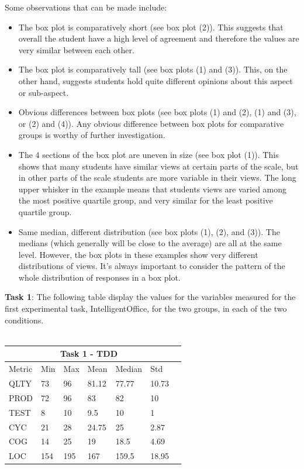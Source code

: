 Some observations that can be made include:
\begin{itemize}
    \item The box plot is comparatively short (see box plot  (2)). This suggests that overall the student have a high level of agreement and therefore the values are very similar between each other.
    \item The box plot is comparatively tall (see box plots (1) and (3)). This, on the other hand, suggests students hold quite different opinions about this aspect or sub-aspect.
    \item Obvious differences between box plots (see box plots (1) and (2), (1) and (3), or (2) and (4)). Any obvious difference between box plots for comparative groups is worthy of further investigation.
    \item The 4 sections of the box plot are uneven in size (see box plot (1)). This shows that many students have similar views at certain parts of the scale, but in other parts of the scale students are more variable in their views. The long upper whisker in the example means that students views are varied among the most positive quartile group, and very similar for the least positive quartile group. 
    \item Same median, different distribution (see box plots (1), (2), and (3)). The medians (which generally will be close to the average) are all at the same level. However, the box plots in these examples show very different distributions of views. It's always important to consider the pattern of the whole distribution of responses in a box plot.
\end{itemize}

\noindent\textbf{Task 1}: The following table display the values for the variables measured for the first experimental task, IntelligentOffice, for the two groups, in each of the two conditions.
\\ \  \\
\noindent
\begin{tabular}{ |p{2cm}||p{1.6cm}|p{1.6cm}|p{1.6cm}|p{1.6cm}|p{1.6cm}|p{1.6cm}| }
    \hline
        \multicolumn{6}{|c|}{Task 1 - TDD} \\
    \hline
        Metric & Min & Max & Mean & Median & Std \\
    \hline
        QLTY & 73 & 96 & 81.12 & 77.77 & 10.73 \\
        PROD & 72 & 96 & 83 & 82 & 10 \\
        TEST & 8 & 10 & 9.5 & 10 & 1 \\
        CYC & 21 & 28 & 24.75 & 25 & 2.87 \\
        COG & 14 & 25 & 19 & 18.5 & 4.69 \\
        LOC & 154 & 195 & 167 & 159.5 & 18.95 \\
    \hline
\end{tabular}
\\ \  \\


